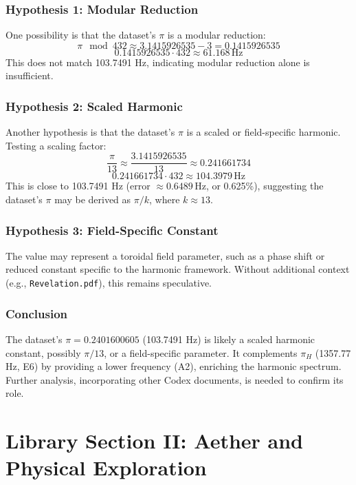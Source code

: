 \documentclass[a4paper,12pt]{book}
\begin{document}
\subsubsection{Hypothesis 1: Modular Reduction}
One possibility is that the dataset’s \(\pi\) is a modular reduction:
\[
\pi \mod 432 \approx 3.1415926535 - 3 = 0.1415926535
\]
\[
0.1415926535 \cdot 432 \approx 61.168 \, \text{Hz}
\]
This does not match 103.7491 Hz, indicating modular reduction alone is insufficient.

\subsubsection{Hypothesis 2: Scaled Harmonic}
Another hypothesis is that the dataset’s \(\pi\) is a scaled or field-specific harmonic. Testing a scaling factor:
\[
\frac{\pi}{13} \approx \frac{3.1415926535}{13} \approx 0.241661734
\]
\[
0.241661734 \cdot 432 \approx 104.3979 \, \text{Hz}
\]
This is close to 103.7491 Hz (error \(\approx 0.6489 \, \text{Hz}\), or 0.625\%), suggesting the dataset’s \(\pi\) may be derived as \(\pi / k\), where \(k \approx 13\).

\subsubsection{Hypothesis 3: Field-Specific Constant}
The value may represent a toroidal field parameter, such as a phase shift or reduced constant specific to the harmonic framework. Without additional context (e.g., \texttt{Revelation.pdf}), this remains speculative.

\subsubsection{Conclusion}
The dataset’s \(\pi = 0.2401600605\) (103.7491 Hz) is likely a scaled harmonic constant, possibly \(\pi / 13\), or a field-specific parameter. It complements \(\pi_H\) (1357.77 Hz, E6) by providing a lower frequency (A2), enriching the harmonic spectrum. Further analysis, incorporating other Codex documents, is needed to confirm its role.


\section{Library Section II: Aether and Physical Exploration}
\end{document}
